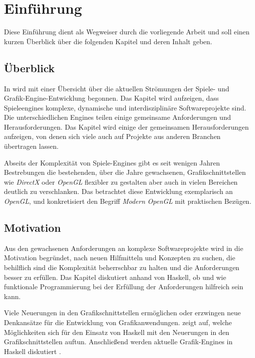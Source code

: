 \chapter{Einführung}

Diese Einführung dient als Wegweiser durch die vorliegende Arbeit und soll einen kurzen Überblick über die folgenden Kapitel und deren Inhalt geben.

\section{Überblick}

In  wird mit einer Übersicht über die aktuellen Strömungen der Spiele- und Grafik-Engine-Entwicklung begonnen. Das Kapitel wird aufzeigen, dass Spieleengines komplexe, dynamische und interdisziplinäre Softwareprojekte sind. Die unterschiedlichen Engines teilen einige gemeinsame Anforderungen und Herausforderungen. Das Kapitel wird einige der gemeinsamen Herausforderungen aufzeigen, von denen sich viele auch auf Projekte aus anderen Branchen übertragen lassen.

Abseits der Komplexität von Spiele-Engines gibt es seit wenigen Jahren Bestrebungen die bestehenden, über die Jahre gewachsenen, Grafikschnittstellen wie \textit{DirectX} oder \textit{OpenGL} flexibler zu gestalten aber auch in vielen Bereichen deutlich zu verschlanken. Das  betrachtet diese Entwicklung exemplarisch an \textit{OpenGL}, und konkretisiert den Begriff \textit{Modern OpenGL} mit praktischen Bezügen.

\section{Motivation}

Aus den gewachsenen Anforderungen an komplexe Softwareprojekte wird in  die Motivation begründet, nach neuen Hilfmitteln und Konzepten zu suchen, die behilflich sind die Komplexität beherrschbar zu halten und die Anforderungen besser zu erfüllen. Das Kapitel diskutiert anhand von Haskell, ob und wie funktionale Programmierung bei der Erfüllung der Anforderungen hilfreich sein kann.

Viele Neuerungen in den Grafikschnittstellen ermöglichen oder erzwingen neue Denkansätze für die Entwicklung von Grafikanwendungen.  zeigt auf, welche Möglichkeiten sich für den Einsatz von Haskell mit den Neuerungen in den Grafikschnittstellen auftun. Anschließend werden aktuelle Grafik-Engines in Haskell diskutiert .

